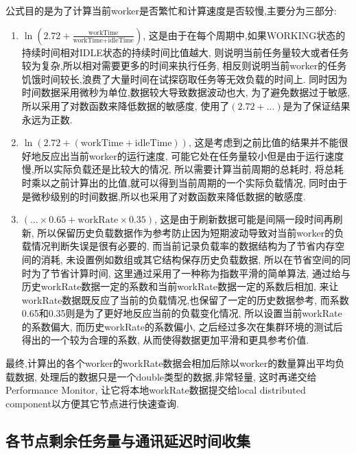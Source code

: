 \documentclass{mproj}
\begin{document}
公式目的是为了计算当前worker是否繁忙和计算速度是否较慢,主要分为三部分:
\begin{enumerate}
    \item $\ln\left( 2.72 + \frac{\text{workTime}}{\text{workTime} + \text{idleTime}} \right)$,
          这是由于在每个周期中,如果WORKING状态的持续时间相对IDLE状态的持续时间比值越大,
          则说明当前任务量较大或者任务较为复杂,所以相对需要更多的时间来执行任务,
          相反则说明当前worker的任务饥饿时间较长,浪费了大量时间在试探窃取任务等无效负载的时间上.
          同时因为时间数据采用微秒为单位,数据较大导致数据波动也大,
          为了避免数据过于敏感,所以采用了对数函数来降低数据的敏感度,
          使用了$(2.72+...)$是为了保证结果永远为正数.

    \item $\ln\left( 2.72 + (\text{workTime} + \text{idleTime}) \right)$,
          这是考虑到之前比值的结果并不能很好地反应出当前worker的运行速度,
          可能它处在任务量较小但是由于运行速度慢,所以实际负载还是比较大的情况,
          所以需要计算当前周期的总耗时,
          将总耗时乘以之前计算出的比值,就可以得到当前周期的一个实际负载情况,
          同时由于是微秒级别的时间数据,所以也采用了对数函数来降低数据的敏感度.

    \item $(... \times 0.65 +\text{workRate} \times 0.35)$,
          这是由于刷新数据可能是间隔一段时间再刷新,
          所以保留历史负载数据作为参考防止因为短期波动导致对当前worker的负载情况判断失误是很有必要的,
          而当前记录负载率的数据结构为了节省内存空间的消耗,
          未设置例如数组或其它结构保存历史负载数据,
          所以在节省空间的同时为了节省计算时间,
          这里通过采用了一种称为指数平滑\cite{GARDNER2006637}的简单算法,
          通过给与历史workRate数据一定的系数和当前workRate数据一定的系数后相加,
          来让workRate数据既反应了当前的负载情况,也保留了一定的历史数据参考,
          而系数0.65和0.35则是为了更好地反应当前的负载变化情况,
          所以设置当前workRate的系数偏大,
          而历史workRate的系数偏小,
          之后经过多次在集群环境的测试后得出的一个较为合理的系数,
          从而使得数据更加平滑和更具参考价值.
\end{enumerate}

最终,计算出的各个worker的workRate数据会相加后除以worker的数量算出平均负载数据,
处理后的数据只是一个double类型的数据,非常轻量,
这时再递交给Performance Monitor,
让它将本地workRate数据提交给local distributed component以方便其它节点进行快速查询.

\subsection{各节点剩余任务量与通讯延迟时间收集}\label{collect_tesks_delay}
\end{document}
